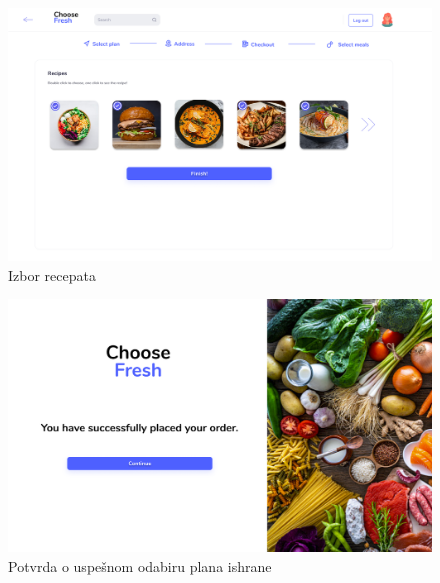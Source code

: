 \begin{figure}[H]
	\begin{center}
		\includegraphics[width=\textwidth]{UI/Select Meal Plan (Screen 4).png}
    		\caption{Izbor recepata}
    \label{fig:SelectMealPlanScreen4}
    \end{center}
\end{figure}

\begin{figure}[H]
	\begin{center}
		\includegraphics[width=\textwidth]{UI/Select Meal Plan (Screen 5).png}
    		\caption{Potvrda o uspešnom odabiru plana ishrane}
    \label{fig:SelectMealPlanScreen5}
    \end{center}
\end{figure}
